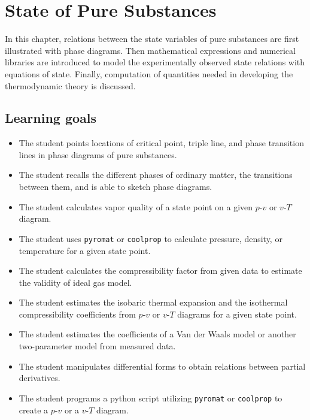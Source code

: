 \chapter{State of Pure Substances}
In this chapter, relations between the state variables of pure substances are first illustrated with phase diagrams. Then mathematical expressions and numerical libraries are introduced to model the experimentally observed state relations with equations of state. Finally, computation of quantities needed in developing the thermodynamic theory is discussed.

\section{Learning goals}

\begin{itemize}
    \item[\elementary] The student points locations of critical point, triple line, and phase transition lines in phase diagrams of pure substances.    \item[\elementary] The student recalls the different phases of ordinary matter, the transitions between them, and is able to sketch phase diagrams.
    \item[\elementary] The student calculates vapor quality of a state point on a given $p$-$v$ or $v$-$T$ diagram.
    \item[\elementary] The student uses \verb|pyromat| or \verb|coolprop| to calculate pressure, density, or temperature for a given state point.
    \item[\elementary] The student calculates the compressibility factor from given data to estimate the validity of ideal gas model.
    \item[\intermediate] The student estimates the isobaric thermal expansion and the isothermal compressibility coefficients from $p$-$v$ or $v$-$T$ diagrams for a given state point.
    \item[\intermediate] The student estimates the coefficients of a Van der Waals model or another two-parameter model from measured data.
    \item[\advanced] The student manipulates differential forms to obtain relations between partial derivatives.
    \item[\advanced] The student programs a python script utilizing \verb|pyromat| or \verb|coolprop| to create a $p$-$v$ or a $v$-$T$ diagram.
\end{itemize}

